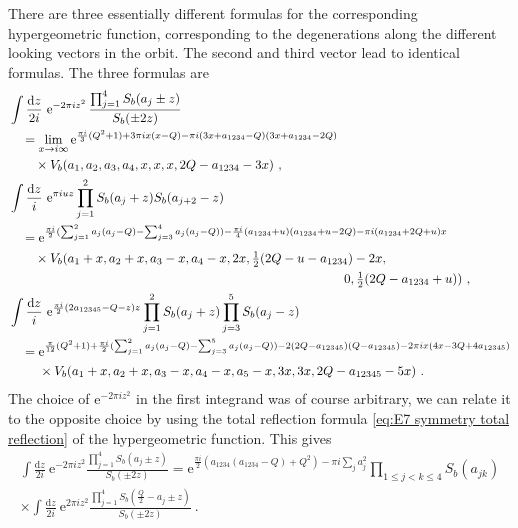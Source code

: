 \documentclass[12pt,a4paper]{article}
\renewcommand\d{\text{d}}
\begin{document}
There are three essentially different formulas for the corresponding hypergeometric function, corresponding to the degenerations along the different looking vectors in the orbit. The second and third vector lead to identical formulas. The three formulas are
\begin{subequations}
\begin{align}
    &\int \frac{\d z}{2i} \ \mathrm{e}^{-2\pi i z^2}\,  \frac{\prod_{j=1}^4 S_b(a_j \pm z)}{S_b(\pm 2z)}\nonumber\\
    &\quad=\lim_{x \to i \infty} \mathrm{e}^{\frac{\pi i}{3}(Q^2+1)+3\pi i x(x-Q)-\pi i(3x+a_{1234}-Q)(3x+a_{1234}-2Q)} \nonumber\\
    &\quad\quad\times V_b(a_1,a_2,a_3,a_4,x,x,x,2Q-a_{1234}-3x)\ , \label{eq:S4Z2 hypergeometric function 1st form}\\
    &\int \frac{\d z}{i}\ \mathrm{e}^{\pi i uz} \prod_{j=1}^2 S_b(a_j+z) S_b(a_{j+2}-z) \nonumber\\
    &\quad=\mathrm{e}^{\frac{\pi i}{2} (\sum_{j=1}^2 a_j(a_j-Q)-\sum_{j=3}^4 a_j(a_j-Q))-\frac{\pi i}{4} (a_{1234}+u)(a_{1234}+u-2Q)-\pi i (a_{1234}+2Q+u)x} \nonumber\\
    &\quad\quad\times V_b(a_1+x,a_2+x,a_3-x,a_4-x,2x,\tfrac{1}{2}(2Q-u-a_{1234})-2x,\nonumber\\
    &\hspace{9.2cm} 0,\tfrac{1}{2}(2Q-a_{1234}+u))\ , \label{eq:S4Z2 hypergeometric function 2nd form}\\
    &\int \frac{\d z}{i} \ \mathrm{e}^{\frac{\pi i}{2}(2a_{12345}-Q-z)z} \prod_{j=1}^2 S_b(a_j+z)\prod_{j=3}^5 S_b(a_j-z)\nonumber \\
    &\quad=\mathrm{e}^{\frac{\pi}{12}(Q^2+1)+\frac{\pi i}{2}(\sum_{j=1}^2 a_j(a_j-Q)-\sum_{j=3}^5 a_j(a_j-Q))-2(2Q-a_{12345})(Q-a_{12345})-2\pi ix(4x-3Q+4a_{12345})}\nonumber \\
    &\quad\quad\ \times V_b(a_1+x,a_2+x,a_3-x,a_4-x,a_5-x,3x,3x,2Q-a_{12345}-5x)\ . \label{eq:S4Z2 hypergeometric function 3rd form}%
\end{align}
\end{subequations}
The choice of $\mathrm{e}^{-2\pi i z^2}$ in the first integrand was of course arbitrary, we can relate it to the opposite choice by using the total reflection formula \eqref{eq:E7 symmetry total reflection} of the hypergeometric function. This gives
\begin{multline} 
\int \frac{\d z}{2i}\  \mathrm{e}^{-2\pi i z^2} \frac{\prod_{j=1}^4 S_b(a_j \pm z)}{S_b(\pm 2z)} 
=\mathrm{e}^{\frac{\pi i}{2} (a_{1234}(a_{1234}-Q)+Q^2)-\pi i \sum_j a_j^2} \prod_{1 \le j<k \le 4} S_b(a_{jk})\\
\times \int \frac{\d z}{2i} \ \mathrm{e}^{2\pi i z^2} \frac{\prod_{j=1}^4 S_b(\frac{Q}{2}-a_j \pm z)}{S_b(\pm 2z)}\ .\label{eq:S4Z2 hypergeometric function opposite sign exponent}
\end{multline}
\end{document}
